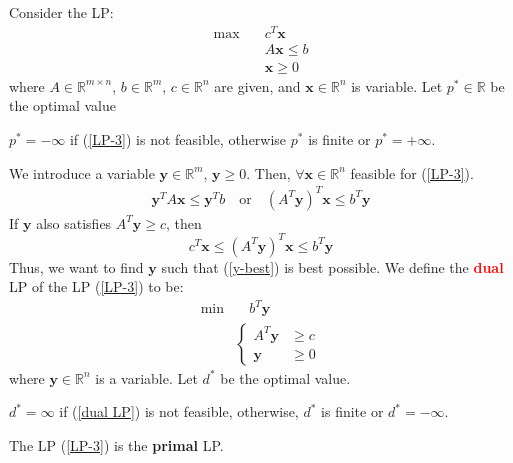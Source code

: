 Consider the LP: 
\begin{align}
    \max &\quad c^T\boldsymbol{x} \nonumber\\
    &\quad A\boldsymbol{x} \le b \nonumber\\
    &\quad \boldsymbol{x}\ge 0 \label{LP-3}
\end{align}
where $A\in\mathbb{R}^{m\times n}$, $b\in\mathbb{R}^m$, $c\in\mathbb{R}^n$ are given, and $\boldsymbol{x}\in\mathbb{R}^n$ is variable. Let $p^*\in\mathbb{R}$ be the optimal value
\begin{remark}
    $p^* = -\infty$ if (\ref{LP-3}) is not feasible, otherwise $p^*$ is finite or $p^* = +\infty$.
\end{remark} 
We introduce a variable $\boldsymbol{y}\in\mathbb{R}^m$, $\boldsymbol{y}\ge 0$. Then, $\forall \boldsymbol{x}\in \mathbb{R}^n$ feasible for (\ref{LP-3}).
\begin{align}
    \boldsymbol{y}^T A\boldsymbol{x}\le \boldsymbol{y}^T b\quad\text{or}\quad \left(A^T\boldsymbol{y}\right)^T\boldsymbol{x}\le b^T\boldsymbol{y}
\end{align}
If $\boldsymbol{y}$ also satisfies $A^T\boldsymbol{y}\ge c$, then
\begin{equation}
    c^T\boldsymbol{x}\le \left(A^T\boldsymbol{y}\right)^T\boldsymbol{x}\le b^T\boldsymbol{y}\label{y-best}
\end{equation}
Thus, we want to find $\boldsymbol{y}$ such that (\ref{y-best}) is best possible. We define the \textcolor{red}{\textbf{dual}} LP of the LP (\ref{LP-3}) to be:
\begin{align}
    \min &\quad b^T\boldsymbol{y}\nonumber \\
    & \left\lbrace\begin{array}{rl}
        A^T\boldsymbol{y}&\ge c  \\
         \boldsymbol{y}&\ge 0 
    \end{array} \right.\label{dual LP}
\end{align}
where $\boldsymbol{y}\in\mathbb{R}^n$ is a variable. Let $d^*$ be the optimal value.
\begin{remark}
    $d^* = \infty$ if (\ref{dual LP}) is not feasible, otherwise, $d^*$ is finite or $d^* = -\infty$.
\end{remark}
The LP (\ref{LP-3}) is the \textbf{primal} LP.

